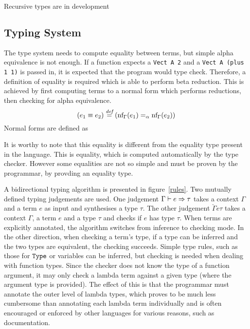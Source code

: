 \documentclass[12pt,a4paper,twoside]{report}
\begin{document}
Recursive types are in development 


\subsection{Typing System}

The type system needs to compute equality between terms, but simple alpha equivalence is not enough.
If a function expects a \lstinline{Vect A 2} and a \lstinline{Vect A (plus 1 1)} is passed in, it is expected that the program would type check.
Therefore, a definition of equality is required which is able to perform beta reduction.
This is achieved by first computing terms to a normal form which performs reductions, then checking for alpha equivalence. 
\[
    (e_1 \equiv e_2) \overset{\textit{def}}{=} (\text{nf}_{\Gamma}(e_1) =_{\alpha} \text{nf}_{\Gamma}(e_2))
\]
Normal forms are defined as
\nfs
{}

It is worthy to note that this equality is different from the equality type present in the language.
This is  equality, which is computed automatically by the type checker.
However some equalities are not so simple and must be proven by the programmar, by provding an equality type. 

A bidirectional typing algorithm \citeneeded is presented in figure~\ref{rules}.
Two mutually defined typing judgements are used.
One judgement \(\Gamma \vdash e \Rightarrow \tau\) takes a context \(\Gamma\) and a term \(e\) as input and synthesises a type \(\tau\).
The other judgement \(\check{\Gamma}{e}{\tau}\) takes a context \(\Gamma\), a term \(e\) and a type \(\tau\) and checks if \(e\) has type \(\tau\).
When terms are explicitly annotated, the algorithm switches from inference to checking mode.
In the other direction, when checking a term's type, if a type can be inferred and the two types are equivalent, the checking succeeds.
Simple type rules, such as those for \(\mathtt{Type}\) or variables can be inferred, but checking is needed when dealing with function types.
Since the checker does not know the type of a function argument, it may only check a lambda term against a given type (where the argument type is provided).
The effect of this is that the programmar must annotate the outer level of lambda types, which proves to be much less cumbersome than annotating each lambda term individually and is often encouraged or enforced by other languages for various reasons, such as documentation.
\end{document}
